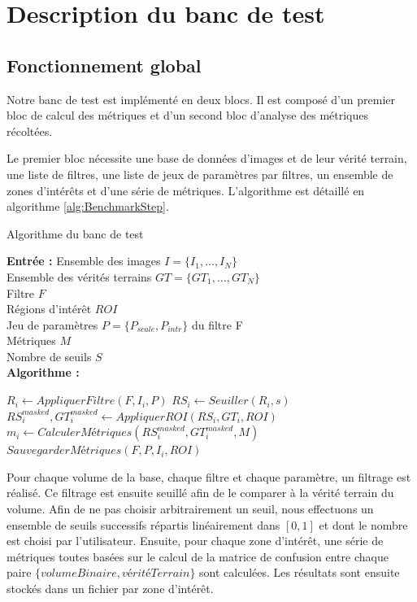 \section{Description du banc de test}
\subsection{Fonctionnement global}
Notre banc de test est implémenté en deux blocs. Il est composé d'un premier bloc de calcul des métriques et d'un second bloc d'analyse des métriques récoltées.

Le premier bloc nécessite une base de données d'images et de leur vérité terrain, une liste de filtres, une liste de jeux de paramètres par filtres, un ensemble de zones d'intérêts et d'une série de métriques. L'algorithme est détaillé en algorithme \ref{alg:BenchmarkStep}.

\begin{algorithm}[!ht]
  \caption{Algorithme du banc de test}\label{alg:BenchmarkStep}
      \textbf{Entrée :}
      Ensemble des images $I=\{I_1,\ldots,I_N\}$ \\
      Ensemble des vérités terrains $GT=\{GT_1,\ldots,GT_N\}$\\
      Filtre $F$\\
      Régions d'intérêt $ROI$\\
      Jeu de paramètres  $P=\{ P_{scale},P_{intr} \} $ du filtre F\\ 
      Métriques $M$\\
      Nombre de seuils $S$ \\
      \textbf{Algorithme :}
      \begin{algorithmic}
              \State $R_{i} \gets AppliquerFiltre(F,I_i,P)$
                \State $RS_{i} \gets Seuiller(R_{i},s)$
                \State $RS_{i}^{masked},GT_{i}^{masked} \gets AppliquerROI( RS_{i},GT_{i}, ROI ) $
                \State $m_{i} \gets CalculerMétriques(RS_{i}^{masked}, GT_{i}^{masked}, M)$
                \State $SauvegarderMétriques(F,P,I_i,ROI)$
              \EndFor
          \EndFor
      \end{algorithmic}
  \end{algorithm}

Pour chaque volume de la base, chaque filtre et chaque paramètre, un filtrage est réalisé. Ce filtrage est ensuite seuillé afin de le comparer à la vérité terrain du volume. Afin de ne pas choisir arbitrairement un seuil, nous effectuons un ensemble de seuils successifs répartis linéairement dans $[0,1]$ et dont le nombre est choisi par l'utilisateur. Ensuite, pour chaque zone d'intérêt, une série de métriques toutes basées sur le calcul de la matrice de confusion entre chaque paire $\{volume Binaire, vérité Terrain\}$ sont calculées. Les résultats sont ensuite stockés dans un fichier par zone d'intérêt.

